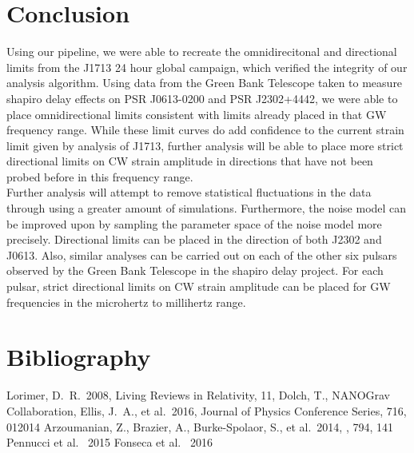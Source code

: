 \documentclass[12pt]{article}
\begin{document}
\section{Conclusion}
    Using our pipeline, we were able to recreate the omnidirecitonal and
directional limits from the J1713 24 hour global campaign, which verified the
integrity of our analysis algorithm. Using data from the Green Bank Telescope
taken to measure shapiro delay effects on PSR J0613-0200 and PSR J2302+4442, we
were able to place omnidirectional limits consistent with limits already placed
in that GW frequency range. 
    While these limit curves do add confidence to the current strain limit given
by analysis of J1713, further analysis will be able to place more strict
directional limits on CW strain amplitude in directions that have not been
probed before in this frequency range.
\\
    Further analysis will attempt to remove statistical fluctuations in the data
through using a greater amount of simulations. Furthermore, the noise model can
be improved upon by sampling the parameter space of the noise model more
precisely. Directional limits can be placed in the direction of both J2302 and
J0613. Also, similar analyses can be carried out on each of the other six
pulsars observed by the Green Bank Telescope in the shapiro delay project. For
each pulsar, strict directional limits on CW strain amplitude can be placed for
GW frequencies in the microhertz to millihertz range.

\newpage
\section{Bibliography}
\noindent Lorimer, D.~R.\ 2008, Living Reviews in Relativity, 11,
\newline\noindent Dolch, T., NANOGrav Collaboration, Ellis, J.~A., et al.\ 2016,
Journal of Physics Conference Series, 716, 012014
\newline\noindent Arzoumanian, Z., Brazier, A., Burke-Spolaor, S., et al.\ 2014,
\apj, 794, 141
\newline\noindent Pennucci et al. \ 2015
\newline\noindent Fonseca et al. \ 2016
\end{document}
